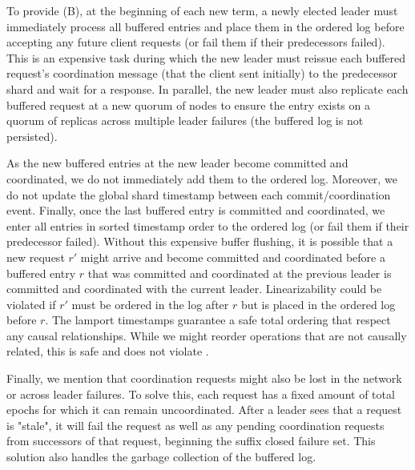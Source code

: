 To provide (B), at the beginning of each new term, a newly elected leader must immediately process all buffered entries and place them in the ordered log before accepting any future client requests (or fail them if their predecessors failed). This is an expensive task during which the new leader must reissue each buffered request's coordination message (that the client sent initially) to the predecessor shard and wait for a response. In parallel, the new leader must also replicate each buffered request at a new quorum of nodes to ensure the entry exists on a quorum of replicas across multiple leader failures (the buffered log is not persisted). 

As the new buffered entries at the new leader become committed and coordinated, we do not immediately add them to the ordered log. Moreover, we do not update the global shard timestamp between each commit/coordination event. Finally, once the last buffered entry is committed and coordinated, we enter all entries in sorted timestamp order to the ordered log (or fail them if their predecessor failed). Without this expensive buffer flushing, it is possible that a new request $r'$ might arrive and become committed and coordinated before a buffered entry $r$ that was committed and coordinated at the previous leader is committed and coordinated with the current leader. Linearizability could be violated if $r'$ must be ordered in the log after $r$ but is placed in the ordered log before $r$. The lamport timestamps guarantee a safe total ordering that respect any causal relationships. While we might reorder operations that are not causally related, this is safe and does not violate \mdl. 

Finally, we mention that coordination requests might also be lost in the network or across leader failures. To solve this, each request has a fixed amount of total epochs for which it can remain uncoordinated. After a leader sees that a request is "stale", it will fail the request as well as any pending coordination requests from successors of that request, beginning the suffix closed failure set. This solution also handles the garbage collection of the buffered log.

